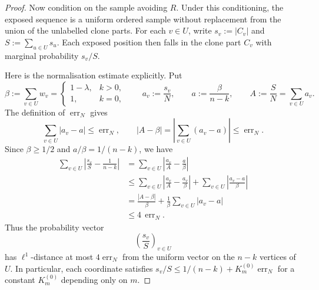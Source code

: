 \documentclass[11pt]{article}
\theoremstyle{definition}
\begin{document}
\begin{proof}
Now condition on the sample avoiding $R$.  Under this conditioning, the exposed
sequence is a uniform ordered sample without replacement from the union of the
unlabelled clone parts.  For each $v\in U$, write $s_v:=|C_v|$ and
$S:=\sum_{u\in U}s_u$.  Each exposed position then falls in the clone part
$C_v$ with marginal probability $s_v/S$.

Here is the normalisation estimate explicitly.  Put
\[
  \beta:=\sum_{v\in U}w_v
  =
  \begin{cases}
    1-\lambda,& k>0,\\
    1,& k=0,
  \end{cases}
  \qquad
  a_v:=\frac{s_v}{N},\qquad
  a:=\frac{\beta}{n-k},\qquad
  A:=\frac SN=\sum_{v\in U}a_v .
\]
The definition of $\operatorname{err}_N$ gives
\[
  \sum_{v\in U}
  |a_v-a|
  \le \operatorname{err}_N,
  \qquad
  |A-\beta|
  =
  \left|\sum_{v\in U}(a_v-a)\right|
  \le \operatorname{err}_N .
\]
Since $\beta\ge1/2$ and $a/\beta=1/(n-k)$, we have
\[
\begin{aligned}
  \sum_{v\in U}\left|\frac{s_v}{S}-\frac1{n-k}\right|
  &=
  \sum_{v\in U}\left|\frac{a_v}{A}-\frac{a}{\beta}\right|  \\
  &\le
  \sum_{v\in U}\left|\frac{a_v}{A}-\frac{a_v}{\beta}\right|
  +
  \sum_{v\in U}\left|\frac{a_v-a}{\beta}\right|  \\
  &=
  \frac{|A-\beta|}{\beta}
  +
  \frac1{\beta}\sum_{v\in U}|a_v-a|  \\
  &\le 4\,\operatorname{err}_N .
\end{aligned}
\]
Thus the probability vector
\[
  \left(\frac{s_v}{S}\right)_{v\in U}
\]
has $\ell^1$-distance at most $4\operatorname{err}_N$ from the uniform vector on
the $n-k$ vertices of $U$.  In particular, each coordinate satisfies
$s_v/S\le 1/(n-k)+K_m^{(0)}\operatorname{err}_N$ for a constant
$K_m^{(0)}$ depending only on $m$.


\end{proof}
\end{document}
